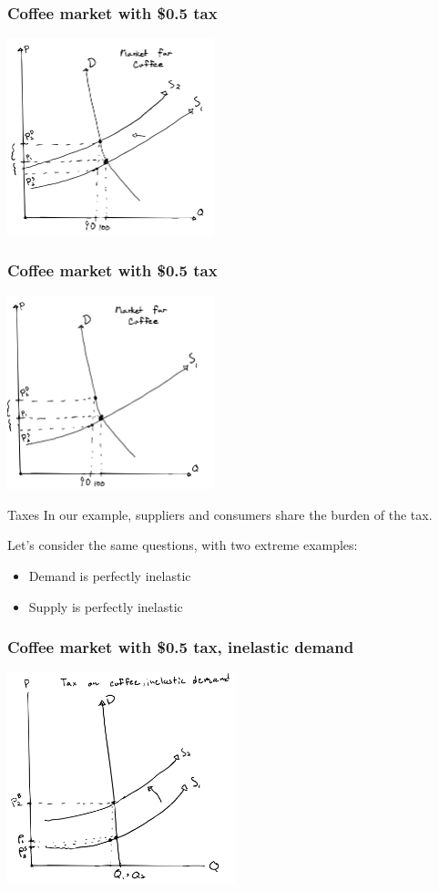 \documentclass[aspectratio=169]{beamer}
\begin{document}
\begin{frame}
    \frametitle{Coffee market with \$0.5 tax}
    \centering
    \includegraphics[width = 0.45\textwidth,keepaspectratio]{coffee_tax_1.png}
\end{frame}

\begin{frame}
    \frametitle{Coffee market with \$0.5 tax}
    \centering
    \includegraphics[width = 0.45\textwidth,keepaspectratio]{coffee_tax_1b.png}
\end{frame}

\begin{frame}{Taxes}
    In our example, suppliers and consumers share the burden of the tax.

    \vspace{5mm}

    Let's consider the same questions, with two extreme examples:
    \begin{itemize}
        \item Demand is perfectly inelastic
        \item Supply is perfectly inelastic
    \end{itemize}
\end{frame}

\begin{frame}
    \frametitle{Coffee market with \$0.5 tax, inelastic demand}
    \centering
    \includegraphics[width = 0.5\textwidth,keepaspectratio]{coffee_tax_id.png}
\end{frame}
\end{document}
